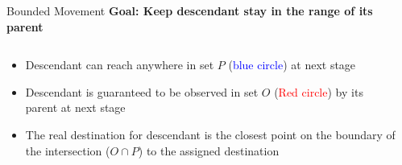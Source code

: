 \begin{frame}{Bounded Movement}{}
  \textbf{Goal: Keep descendant stay in the range of its parent}
    \begin{columns}[T] %
      \begin{column}{.5\textwidth}
        \begin{itemize}
        \item \small{Descendant can reach anywhere in set $P$
            (\textcolor{blue}{blue circle}) at next stage}
        \item \small{Descendant is guaranteed to be observed in set $O$
            (\textcolor{red}{Red circle}) by its parent at next stage}
        \item \small{The real destination for descendant is the closest point
            on the boundary of the intersection ($O\cap P$) to the
            assigned destination}
        \end{itemize}
      \end{column}%
      \begin{column}{.4\textwidth}
             
      \end{column}%
    \end{columns} 
\end{frame}